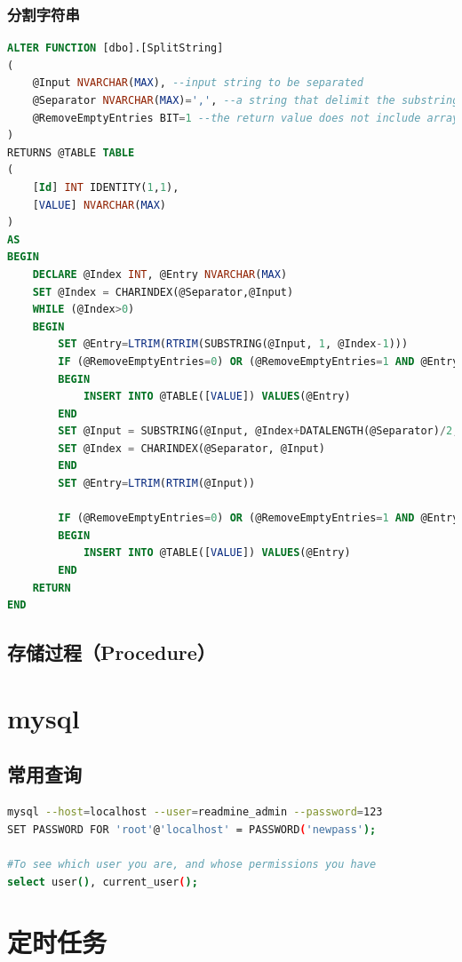 \documentclass{book}
\begin{document}
\subsubsection{分割字符串}

\begin{lstlisting}[language=SQL]
ALTER FUNCTION [dbo].[SplitString]
(
	@Input NVARCHAR(MAX), --input string to be separated
	@Separator NVARCHAR(MAX)=',', --a string that delimit the substrings in the input string
	@RemoveEmptyEntries BIT=1 --the return value does not include array elements that contain an empty string
)
RETURNS @TABLE TABLE
(
	[Id] INT IDENTITY(1,1),
	[VALUE] NVARCHAR(MAX)
)
AS
BEGIN
	DECLARE @Index INT, @Entry NVARCHAR(MAX)
	SET @Index = CHARINDEX(@Separator,@Input)
	WHILE (@Index>0)
	BEGIN
		SET @Entry=LTRIM(RTRIM(SUBSTRING(@Input, 1, @Index-1)))
		IF (@RemoveEmptyEntries=0) OR (@RemoveEmptyEntries=1 AND @Entry<>'')
		BEGIN
			INSERT INTO @TABLE([VALUE]) VALUES(@Entry)
		END
		SET @Input = SUBSTRING(@Input, @Index+DATALENGTH(@Separator)/2, LEN(@Input))
		SET @Index = CHARINDEX(@Separator, @Input)
		END
		SET @Entry=LTRIM(RTRIM(@Input))
		
		IF (@RemoveEmptyEntries=0) OR (@RemoveEmptyEntries=1 AND @Entry<>'')
		BEGIN
			INSERT INTO @TABLE([VALUE]) VALUES(@Entry)
		END
	RETURN
END
\end{lstlisting}

\subsection{存储过程（Procedure）}

\section{mysql}

\subsection{常用查询}

\begin{lstlisting}[language=Bash]
mysql --host=localhost --user=readmine_admin --password=123
SET PASSWORD FOR 'root'@'localhost' = PASSWORD('newpass');

#To see which user you are, and whose permissions you have
select user(), current_user();
\end{lstlisting}



\section{定时任务}
\end{document}
